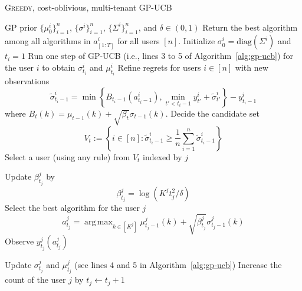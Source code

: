 \documentclass[letterpaper]{vldb}
\newcommand{\greedy}{\textsc{Greedy}\xspace}
\DeclareMathOperator*{\argmax}{arg\,max}
\begin{document}
\begin{algorithm} [t!]                     %
\scriptsize
\caption{\greedy, cost-oblivious, multi-tenant GP-UCB}          %
\label{alg:mc-general}                           %
\begin{algorithmic}[1]                    %
   \REQUIRE GP prior $\{\mu_0^i\}_{i=1}^n$, $\{\sigma^i\}_{i=1}^n$, $\{\Sigma^i\}_{i=1}^n$, and $\delta\in (0,1)$
   \ENSURE Return the best algorithm among all algorithms in $a_{[1:T]}^i$ for all users $[n]$.
       \STATE Initialize $\sigma_0^i = \text{diag}(\Sigma^i)$ and $t_i=1$
       \STATE Run one step of GP-UCB (i.e., lines 3 to 5 of Algorithm~\ref{alg:gp-ucb}) for the user $i$ to obtain $\sigma^i_{t_i}$ and $\mu^i_{t_i}$
   \ENDFOR
        \STATE Refine regrets for users $i\in[n]$ with new observations
        \[
   \tilde{\sigma}^i_{t_i-1} = \min\left\{B_{t_i-1}(a^i_{t_i-1}), \min_{t'<t_i-1} y^i_{t'}+ \tilde{\sigma}^{i}_{t'} \right\} - y^i_{t_i-1} 
   \]
   where $
   B_t(k)=\mu_{t-1}(k) + \sqrt{\beta_t}\sigma_{t-1}(k)$.
      \STATE Decide the candidate set
   \[
     V_t := \left\{ i\in [n]: 
         \tilde{\sigma}^i_{t_i-1} \ge \frac{1}{n}
       \sum_{i=1}^n 
         \tilde{\sigma}^i_{t_i-1}\right\}
   \]
   \STATE Select a user (using any rule) from $V_t$ indexed by $j$

   \STATE  Update $\beta_{t_j}^j$ by
   \[
     \beta_{t_j}^j = \log (K^j t_j^2/\delta)
   \]
   \STATE Select the best algorithm for the user $j$
   \[
     a^j_{t_j} = \argmax_{k\in [K^j]}\mu^j_{{t_j}-1}(k) + \sqrt{\beta^j_{t_j}}\sigma^j_{t_j-1}(k)
     \]
     \STATE Observe $y^j_{t_j}(a^j_{t_j})$

     \STATE Update $\sigma^j_{t_j}$ and $\mu^j_{t_j}$ (see lines 4 and 5 in Algorithm~\ref{alg:gp-ucb})
        \STATE Increase the count of the user $j$ by $t_j \leftarrow t_j + 1$
   \ENDFOR
\end{algorithmic}
\end{algorithm}
\end{document}
